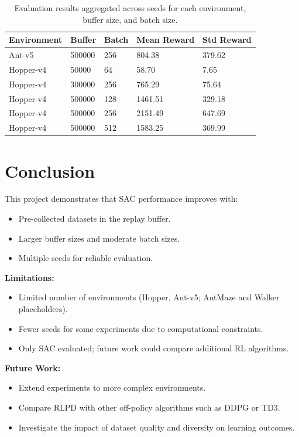 \documentclass[12pt]{article}
\begin{document}
\begin{table}[H]
\centering
\begin{tabular}{l l l l l}
\toprule
Environment & Buffer & Batch & Mean Reward & Std Reward \\
\midrule
Ant-v5 & 500000 & 256 & 804.38 & 379.62 \\
Hopper-v4 & 50000 & 64 & 58.70 & 7.65 \\
Hopper-v4 & 300000 & 256 & 765.29 & 75.64 \\
Hopper-v4 & 500000 & 128 & 1461.51 & 329.18 \\
Hopper-v4 & 500000 & 256 & 2151.49 & 647.69 \\
Hopper-v4 & 500000 & 512 & 1583.25 & 369.99 \\
\bottomrule
\end{tabular}
\caption{Evaluation results aggregated across seeds for each environment, buffer size, and batch size.}
\end{table}

\section{Conclusion}
This project demonstrates that SAC performance improves with:

\begin{itemize}
    \item Pre-collected datasets in the replay buffer.
    \item Larger buffer sizes and moderate batch sizes.
    \item Multiple seeds for reliable evaluation.
\end{itemize}

\textbf{Limitations:}
\begin{itemize}
    \item Limited number of environments (Hopper, Ant-v5; AntMaze and Walker placeholders).
    \item Fewer seeds for some experiments due to computational constraints.
    \item Only SAC evaluated; future work could compare additional RL algorithms.
\end{itemize}

\textbf{Future Work:}
\begin{itemize}
    \item Extend experiments to more complex environments.
    \item Compare RLPD with other off-policy algorithms such as DDPG or TD3.
    \item Investigate the impact of dataset quality and diversity on learning outcomes.
\end{itemize}
\end{document}
